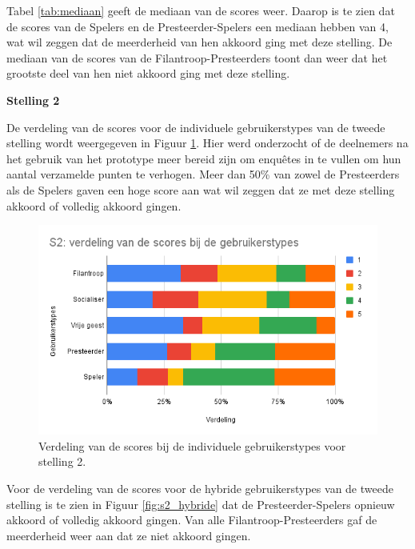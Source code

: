 Tabel \ref{tab:mediaan} geeft de mediaan van de scores weer. Daarop is te zien dat de scores van de Spelers en de Presteerder-Spelers een mediaan hebben van 4, wat wil zeggen dat de meerderheid van hen akkoord ging met deze stelling. De mediaan van de scores van de Filantroop-Presteerders toont dan weer dat het grootste deel van hen niet akkoord ging met deze stelling.

\textbf{Stelling 2}

De verdeling van de scores voor de individuele gebruikerstypes van de tweede stelling wordt weergegeven in Figuur \ref{fig:s2}. Hier werd onderzocht of de deelnemers na het gebruik van het prototype meer bereid zijn om enquêtes in te vullen om hun aantal verzamelde punten te verhogen. Meer dan 50\% van zowel de Presteerders als de Spelers gaven een hoge score aan wat wil zeggen dat ze met deze stelling akkoord of volledig akkoord gingen.

\begin{figure}
    \includegraphics[width=\linewidth]{S2.png}
    \caption{Verdeling van de scores bij de individuele gebruikerstypes voor stelling 2.}
    \label{fig:s2}
\end{figure}

Voor de verdeling van de scores voor de hybride gebruikerstypes van de tweede stelling is te zien in Figuur \ref{fig:s2_hybride} dat de Presteerder-Spelers opnieuw akkoord of volledig akkoord gingen. Van alle Filantroop-Presteerders gaf de meerderheid weer aan dat ze niet akkoord gingen.

